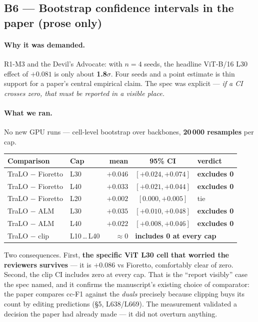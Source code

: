 \documentclass[11pt,a4paper]{article}
\begin{document}
\subsection*{B6 --- Bootstrap confidence intervals
\hfill\normalsize\textcolor{okgreen}{\textbf{in the paper (prose only)}}}

\paragraph{Why it was demanded.} R1-M3 and the Devil's Advocate: with $n{=}4$ seeds, the headline
ViT-B/16 L30 effect of $+0.081$ is only about \textbf{1.8$\sigma$}. Four seeds and a point estimate
is thin support for a paper's central empirical claim. The spec was explicit --- \emph{if a CI
crosses zero, that must be reported in a visible place.}

\paragraph{What we ran.} No new GPU runs --- cell-level bootstrap over backbones,
\textbf{20\,000 resamples} per cap.

\begin{center}
\begin{tabular}{@{}l l r c l@{}}
\toprule
\textbf{Comparison} & \textbf{Cap} & \textbf{mean} & \textbf{95\% CI} & \textbf{verdict} \\
\midrule
TraLO $-$ Fioretto & L30 & $+0.046$ & $[+0.024, +0.074]$ & \textbf{excludes 0} \\
TraLO $-$ Fioretto & L40 & $+0.033$ & $[+0.021, +0.044]$ & \textbf{excludes 0} \\
TraLO $-$ Fioretto & L20 & $+0.002$ & $[0.000, +0.005]$  & tie \\
TraLO $-$ ALM      & L30 & $+0.035$ & $[+0.010, +0.048]$ & \textbf{excludes 0} \\
TraLO $-$ ALM      & L40 & $+0.022$ & $[+0.008, +0.046]$ & \textbf{excludes 0} \\
TraLO $-$ clip     & L10\,\dots\,L40 & $\approx 0$ & \multicolumn{2}{l}{\textbf{includes 0 at every cap}} \\
\bottomrule
\end{tabular}
\end{center}

Two consequences. First, \textbf{the specific ViT L30 cell that worried the reviewers survives} ---
it is $+0.086$ vs Fioretto, comfortably clear of zero. Second, the clip CI includes zero at every
cap. That is the ``report visibly'' case the spec named, and it confirms the manuscript's existing
choice of comparator: the paper compares cc-F1 against the \emph{duals} precisely because clipping
buys its count by editing predictions (\S5, L638/L669). The measurement validated a decision the
paper had already made --- it did not overturn anything.
\end{document}
